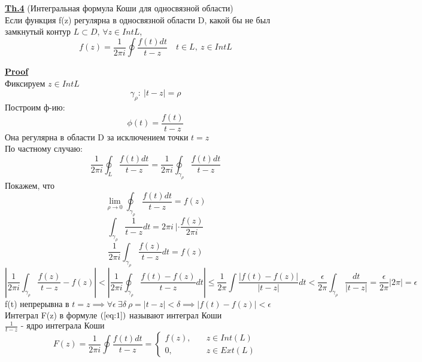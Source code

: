 \documentclass[a4paper]{article}
\begin{document}
\begin{tcolorbox}
\textbf{\underline{Th.4}} (Интегральная формула Коши для односвязной области)\\
Если функция f(z) регулярна в односвязной области D, какой бы не был замкнутый контур
$ L \subset D $, $ \forall z \in Int L $,
\begin{equation}
    f(z) = \frac{1}{2\pi i} \oint \frac{f(t)dt}
    {t - z} \quad t \in L, \ z \in Int L
    \label{eq:1}
\end{equation}

\textbf{\underline{Proof}}\\
Фиксируем $ z \in Int L $ 
\[
    \gamma_\rho: \ |t-z| = \rho
\]
Построим ф-ию:
\[
    \phi(t) = \frac{f(t)}{t-z}
\]
Она регулярна в области D за исключением точки $ t=z $\\
По частному случаю:
\begin{equation}
    \frac{1}{2\pi i} \oint_L \frac{f(t)dt}{t-z} = \frac{1}{2\pi i} \oint_{\gamma_\rho}
    \frac{f(t)dt}{t-z} 
\end{equation}
Покажем, что
\begin{equation}
    \lim_{\rho \to 0} \oint_{\gamma_\rho} \frac{f(t)dt}{t-z} = f(z)
\end{equation}
\[
    \int_{\gamma_\rho} \frac{1}{t-z} dt = 2\pi i \ | \cdot \frac{f(z)}{2\pi i} 
\]
\[
    \frac{1}{2\pi i} \int_{\gamma_\rho} \frac{f(z)}{t-z} dt = f(z)
\]
\[
    \left|\frac{1}{2\pi i} \int_{\gamma_\rho} \frac{f(z)}{t-z} - f(z) \right| <
    \left| \frac{1}{2\pi i} \oint_{\gamma_\rho} \frac{f(t) - f(z)}{t-z} dt
    \right|
    \leq \frac{1}{2\pi} \int \frac{|f(t) - f(z)|}{|t-z|} dt
    < \frac{\epsilon}{2\pi} \int_{\gamma_\rho}\frac{dt}{|t-z|} = \frac{\epsilon}
    {2\pi} |2\pi| = \epsilon
\]
f(t) непрерывна в $ t = z \implies \forall \epsilon \ \exists \delta \ 
\rho = |t-z| < \delta \implies |f(t) - f(z)| < \epsilon$  \\ 
Интеграл F(z) в формуле $ (\ref{eq:1}) $ называют интеграл Коши \\
$\frac{1}{t-z} \text{ - ядро интеграла Коши}$ 
\[
    F(z) = \frac{1}{2\pi i} \oint \frac{f(t)dt}{t-z} = 
    \begin{cases}
        f(z), &\quad z \in Int(L)\\
        0, &\quad z \in Ext(L)
    \end{cases}
\]
\end{tcolorbox}
\end{document}
